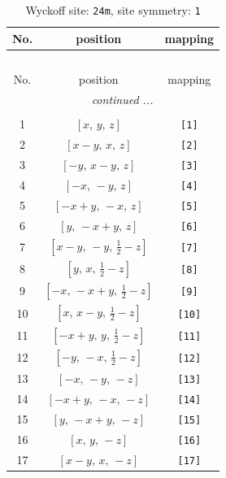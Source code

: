 \documentclass[fleqn,8pt]{jsarticle}
\begin{document}
\begin{longtable}{ccc}
\caption{Wyckoff site: {\tt 24m}, site symmetry: {\tt 1}}
 \\
 \hline \hline
No. & position & mapping \\ \hline \endfirsthead

\multicolumn{2}{l}{\tablename\ \thetable{}} \\
 \hline \hline
No. & position & mapping \\ \hline \endhead

 \hline \hline
\multicolumn{2}{r}{\footnotesize\it continued ...} \\ \endfoot

 \hline \hline
\multicolumn{2}{r}{} \\ \endlastfoot

1 & $\left[ x,\, y,\, z \right]$ & {\tt [1]} \\ \hline
2 & $\left[ x - y,\, x,\, z \right]$ & {\tt [2]} \\ \hline
3 & $\left[ - y,\, x - y,\, z \right]$ & {\tt [3]} \\ \hline
4 & $\left[ - x,\, - y,\, z \right]$ & {\tt [4]} \\ \hline
5 & $\left[ - x + y,\, - x,\, z \right]$ & {\tt [5]} \\ \hline
6 & $\left[ y,\, - x + y,\, z \right]$ & {\tt [6]} \\ \hline
7 & $\left[ x - y,\, - y,\, \frac{1}{2} - z \right]$ & {\tt [7]} \\ \hline
8 & $\left[ y,\, x,\, \frac{1}{2} - z \right]$ & {\tt [8]} \\ \hline
9 & $\left[ - x,\, - x + y,\, \frac{1}{2} - z \right]$ & {\tt [9]} \\ \hline
10 & $\left[ x,\, x - y,\, \frac{1}{2} - z \right]$ & {\tt [10]} \\ \hline
11 & $\left[ - x + y,\, y,\, \frac{1}{2} - z \right]$ & {\tt [11]} \\ \hline
12 & $\left[ - y,\, - x,\, \frac{1}{2} - z \right]$ & {\tt [12]} \\ \hline
13 & $\left[ - x,\, - y,\, - z \right]$ & {\tt [13]} \\ \hline
14 & $\left[ - x + y,\, - x,\, - z \right]$ & {\tt [14]} \\ \hline
15 & $\left[ y,\, - x + y,\, - z \right]$ & {\tt [15]} \\ \hline
16 & $\left[ x,\, y,\, - z \right]$ & {\tt [16]} \\ \hline
17 & $\left[ x - y,\, x,\, - z \right]$ & {\tt [17]} \\ \hline

\end{longtable}
\end{document}
